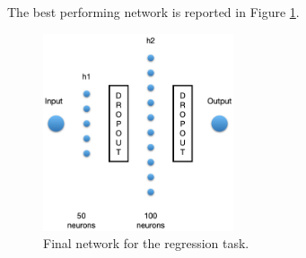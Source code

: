 The best performing network is reported in Figure \ref{fig:reg_net}.
\begin{figure}[h]
    \centering
    \includegraphics[width=0.5\textwidth]{Images/Regression_network.png}
    \caption{Final network for the regression task.}
    \label{fig:reg_net}
\end{figure}